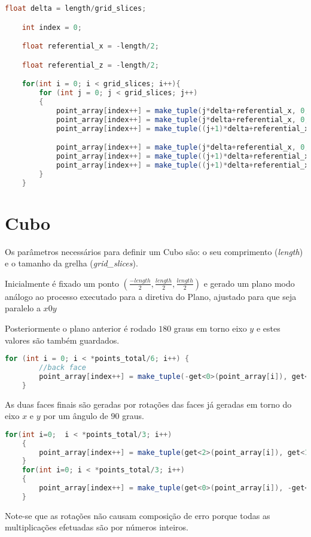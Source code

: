 \documentclass[14pt, a4 paper]{report}
\begin{document}
\begin{lstlisting}[language=java]
    float delta = length/grid_slices;

    int index = 0;

    float referential_x = -length/2;

    float referential_z = -length/2;

    for(int i = 0; i < grid_slices; i++){
        for (int j = 0; j < grid_slices; j++)
        {
            point_array[index++] = make_tuple(j*delta+referential_x, 0, i*delta+referential_z);
            point_array[index++] = make_tuple(j*delta+referential_x, 0, (i+1)*delta+referential_z);
            point_array[index++] = make_tuple((j+1)*delta+referential_x, 0, (i+1)*delta+referential_z);

            point_array[index++] = make_tuple(j*delta+referential_x, 0, i*delta+referential_z);
            point_array[index++] = make_tuple((j+1)*delta+referential_x, 0, (i+1)*delta+referential_z);
            point_array[index++] = make_tuple((j+1)*delta+referential_x, 0, i*delta+referential_z);
        }
    }

\end{lstlisting}

\section{Cubo}
Os parâmetros necessários para definir um Cubo são: o seu comprimento (\textit{length}) e o tamanho da grelha (\textit{grid\_slices}).

Inicialmente é fixado um ponto $(\frac{-length}{2},\frac{length}{2},\frac{length}{2})$ e gerado um plano modo análogo ao processo executado para a diretiva do Plano, ajustado para que seja paralelo a $x0y$

Posteriormente o plano anterior é rodado $180$ graus em torno eixo $y$ e estes valores são também guardados.
\begin{lstlisting}[language=java]
for (int i = 0; i < *points_total/6; i++) {
        //back face
        point_array[index++] = make_tuple(-get<0>(point_array[i]), get<1>(point_array[i]), -get<2>(point_array[i]));
    }
\end{lstlisting}
As duas faces finais são geradas por rotações das faces já geradas em torno do eixo $x$ e $y$ por um ângulo de $90$ graus. 
\begin{lstlisting}[language=java]
    for(int i=0;  i < *points_total/3; i++)
    {
        point_array[index++] = make_tuple(get<2>(point_array[i]), get<1>(point_array[i]), -get<0>(point_array[i]));
    }
    for(int i=0; i < *points_total/3; i++)
    {
        point_array[index++] = make_tuple(get<0>(point_array[i]), -get<2>(point_array[i]), get<1>(point_array[i]));
    }
\end{lstlisting}
Note-se que as rotações não causam composição de erro porque todas as multiplicações efetuadas são por números inteiros.
\end{document}

